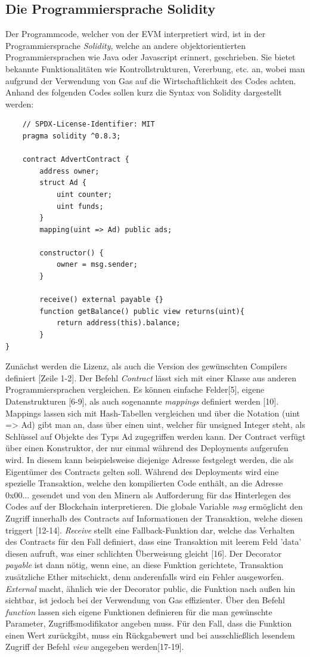 \subsection{Die Programmiersprache Solidity}
Der Programmcode, welcher von der EVM interpretiert wird, ist in der Programmiersprache \emph{Solidity}, welche an andere objektorientierten Programmiersprachen wie Java oder Javascript erinnert, geschrieben. Sie bietet bekannte Funktionalitäten wie Kontrollstrukturen, Vererbung, etc. an, wobei man aufgrund der Verwendung von Gas auf die Wirtschaftlichkeit des Codes achten. Anhand des folgenden Codes sollen kurz die Syntax von Solidity dargestellt werden: 
\begin{lstlisting}
	// SPDX-License-Identifier: MIT
	pragma solidity ^0.8.3;
	
	contract AdvertContract {
		address owner;
		struct Ad {
			uint counter;
			uint funds;
		}
		mapping(uint => Ad) public ads;
		
		constructor() {
			owner = msg.sender;
		}
	
		receive() external payable {}
		function getBalance() public view returns(uint){
			return address(this).balance;
		}
}
	\end{lstlisting}
Zunächst werden die Lizenz, als auch die Version des gewünschten Compilers definiert [Zeile 1-2]. Der Befehl \emph{Contract} lässt sich mit einer Klasse aus anderen Programmiersprachen vergleichen. 
Es können einfache Felder[5], eigene Datenstrukturen [6-9], als auch sogenannte \emph{mappings} definiert werden [10]. Mappings lassen sich mit Hash-Tabellen vergleichen und über die Notation (uint => Ad) gibt man an, dass über einen uint, welcher für unsigned Integer steht, als Schlüssel auf Objekte des Typs Ad zugegriffen werden kann. 
Der Contract verfügt über einen Konstruktor, der nur einmal während des Deployments aufgerufen wird. In diesem kann beispielsweise diejenige Adresse festgelegt werden, die als Eigentümer des Contracts gelten soll. 
Während des Deployments wird eine spezielle Transaktion, welche den kompilierten Code enthält, an die Adresse 0x00... gesendet und von den Minern als Aufforderung für das Hinterlegen des Codes auf der Blockchain interpretieren. 
Die globale Variable \emph{msg} ermöglicht den Zugriff innerhalb des Contracts auf Informationen der Transaktion, welche diesen triggert [12-14].
\emph{Receive} stellt eine Fallback-Funktion dar, welche das Verhalten des Contracts für den Fall definiert, dass eine Transaktion mit leerem Feld 'data' diesen aufruft, was einer schlichten Überweisung gleicht [16]. Der Decorator \emph{payable} ist dann nötig, wenn eine, an diese Funktion gerichtete, Transaktion zusätzliche Ether mitschickt, denn anderenfalls wird ein Fehler ausgeworfen. \emph{External} macht, ähnlich wie der Decorator public, die Funktion nach außen hin sichtbar, ist jedoch bei der Verwendung von Gas effizienter. Über den Befehl \emph{function} lassen sich eigene Funktionen definieren für die man gewünschte Parameter, Zugriffsmodifikator angeben muss. Für den Fall, dass die Funktion einen Wert zurückgibt, muss ein Rückgabewert und bei ausschließlich lesendem Zugriff der Befehl \emph{view} angegeben werden[17-19]. 
